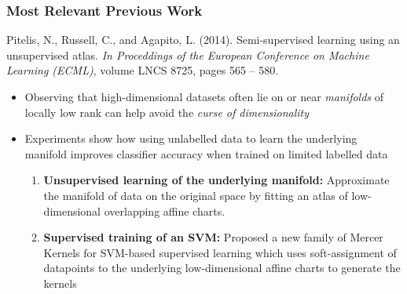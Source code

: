 \documentclass{beamer}
\begin{document}
\begin{frame}
  \frametitle{Most Relevant Previous Work}

  Pitelis, N., Russell, C., and Agapito, L. (2014). Semi-supervised
  learning using an unsupervised atlas. \textit{In Proceddings of the
    European Conference on Machine Learning (ECML)}, volume LNCS 8725,
  pages 565 – 580.

  \begin{itemize}
  \item Observing that high-dimensional datasets often lie on or near
    \textit{manifolds} of locally low rank can help avoid the
    \textit{curse of dimensionality}
  \item Experiments show how using unlabelled data to learn the underlying
    manifold improves classifier accuracy when trained on limited labelled
    data
    \begin{enumerate}
    \item \textbf{Unsupervised learning of the underlying manifold:}
      Approximate the manifold of data on the original space by fitting
      an atlas of low-dimensional overlapping affine charts.
    \item \textbf{Supervised training of an SVM:} Proposed a new family of
      Mercer Kernels for SVM-based supervised learning which uses
      soft-assignment of datapoints to the underlying low-dimensional affine
      charts to generate the kernels
      \end{enumerate}
    \end{itemize}

\end{frame}
\end{document}
